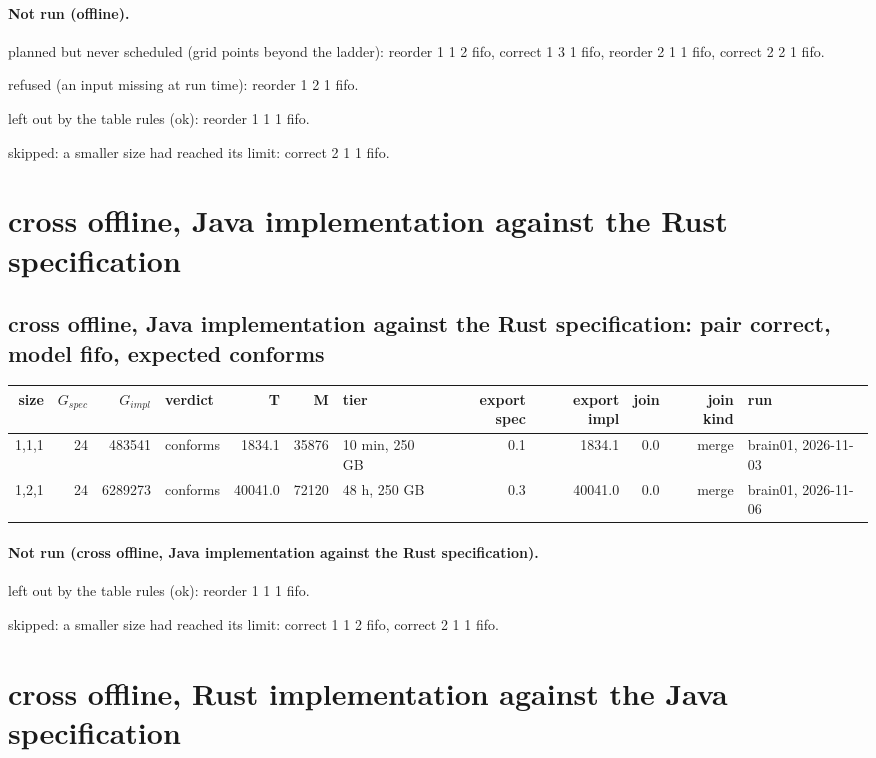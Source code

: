\documentclass[10pt]{article}
\begin{document}
\paragraph{Not run (offline).}
planned but never scheduled (grid points beyond the ladder): reorder 1 1 2 fifo, correct 1 3 1 fifo, reorder 2 1 1 fifo, correct 2 2 1 fifo.\par
refused (an input missing at run time): reorder 1 2 1 fifo.\par
left out by the table rules (ok): reorder 1 1 1 fifo.\par
skipped: a smaller size had reached its limit: correct 2 1 1 fifo.\par
\section*{cross offline, Java implementation against the Rust specification}
\subsection*{cross offline, Java implementation against the Rust specification: pair \textsf{correct}, model fifo, expected conforms}
\begin{longtable}{@{}rrrlrrlrrrrl@{}}
\toprule
size & $G_{\mathit{spec}}$ & $G_{\mathit{impl}}$ & verdict & T & M & tier & export spec & export impl & join & join kind & run \\
\midrule
\endhead
\color{blue} 1,1,1 & 24 & 483541 & conforms & 1834.1 & 35876 & 10 min, 250 GB & 0.1 & 1834.1 & 0.0 & merge & brain01, 2026-11-03 \\
\color{blue} 1,2,1 & 24 & 6289273 & conforms & 40041.0 & 72120 & 48 h, 250 GB & 0.3 & 40041.0 & 0.0 & merge & brain01, 2026-11-06 \\
\bottomrule
\end{longtable}
\paragraph{Not run (cross offline, Java implementation against the Rust specification).}
left out by the table rules (ok): reorder 1 1 1 fifo.\par
skipped: a smaller size had reached its limit: correct 1 1 2 fifo, correct 2 1 1 fifo.\par
\section*{cross offline, Rust implementation against the Java specification}
\end{document}
